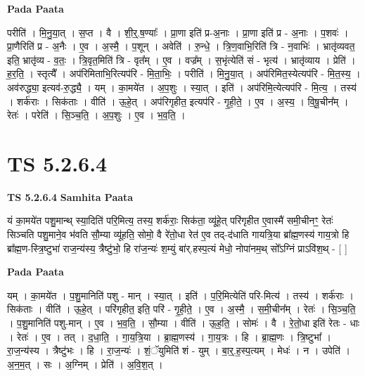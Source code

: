 \documentclass[17pt]{extarticle}
\begin{document}
\textbf{Pada Paata} \newline

परीति॑ । मि॒नु॒या॒त् । स॒प्त । वै । शी॒र्॒.ष॒ण्याः᳚ । प्रा॒णा इति॑ प्र-अ॒नाः । प्रा॒णा इति॑ प्र - अ॒नाः । प॒शवः॑ । प्रा॒णैरिति॑ प्र - अ॒नैः । ए॒व । अ॒स्मै॒ । प॒शून् । अवेति॑ । रु॒न्धे॒ । त्रि॒ण॒वाभि॒रिति॑ त्रि - न॒वाभिः॑ । भ्रातृ॑व्यवत॒ इति॒ भ्रातृ॑व्य - व॒तः॒ । त्रि॒वृत॒मिति॑ त्रि - वृत᳚म् । ए॒व । वज्र᳚म् । स॒भृंत्येति॑ सं - भृत्य॑ । भ्रातृ॑व्याय । प्रेति॑ । ह॒र॒ति॒ । स्तृत्यै᳚ । अप॑रिमिताभि॒रित्यप॑रि - मि॒ता॒भिः॒ । परीति॑ । मि॒नु॒या॒त् । अप॑रिमित॒स्येत्यप॑रि - मि॒त॒स्य॒ । अव॑रुद्ध्या॒ इत्यव॑-रु॒द्ध्यै॒ । यम् । का॒मये॑त । अ॒प॒शुः । स्या॒त् । इति॑ । अप॑रिमि॒त्येत्यप॑रि - मि॒त्य॒ । तस्य॑ । शर्क॑राः । सिक॑ताः । वीति॑ । ऊ॒हे॒त् । अप॑रिगृहीत॒ इत्यप॑रि - गृ॒ही॒ते॒ । ए॒व । अ॒स्य॒ । वि॒षू॒चीन᳚म् । रेतः॑ । परेति॑ । सि॒ञ्च॒ति॒ । अ॒प॒शुः । ए॒व । भ॒व॒ति॒ ।  \newline




\section*{ TS 5.2.6.4 }

\textbf{TS 5.2.6.4 } \newline
\textbf{Samhita Paata} \newline

यं का॒मये॑त पशु॒मान्थ् स्या॒दिति॑ परि॒मित्य॒ तस्य॒ शर्क॑राः॒ सिक॑ता॒ व्यू॑हे॒त् परि॑गृहीत ए॒वास्मै॑ समी॒चीनꣳ॒॒ रेतः॑ सिञ्चति पशु॒माने॒व भ॑वति सौ॒म्या व्यू॑हति॒ सोमो॒ वै रे॑तो॒धा रेत॑ ए॒व तद्-द॑धाति गायत्रि॒या ब्रा᳚ह्म॒णस्य॑ गाय॒त्रो हि ब्रा᳚ह्म॒ण-स्त्रि॒ष्टुभा॑ राज॒न्य॑स्य॒ त्रैष्टु॑भो॒ हि रा॑ज॒न्यः॑ श॒म्युं बा॑र्.हस्प॒त्यं मेधो॒ नोपा॑नम॒थ् सो᳚ऽग्निं प्राऽवि॑श॒थ् - [  ] \newline

\textbf{Pada Paata} \newline

यम् । का॒मये॑त । प॒शु॒मानिति॑ पशु - मान् । स्या॒त् । इति॑ । प॒रि॒मित्येति॑ परि-मित्य॑ । तस्य॑ । शर्क॑राः । सिक॑ताः । वीति॑ । ऊ॒हे॒त् । परि॑गृहीत॒ इति॒ परि॑ - गृ॒ही॒ते॒ । ए॒व । अ॒स्मै॒ । स॒मी॒चीन᳚म् । रेतः॑ । सि॒ञ्च॒ति॒ । प॒शु॒मानिति॑ पशु-मान् । ए॒व । भ॒व॒ति॒ । सौ॒म्या । वीति॑ । ऊ॒ह॒ति॒ । सोमः॑ । वै । रे॒तो॒धा इति॑ रेतः - धाः । रेतः॑ । ए॒व । तत् । द॒धा॒ति॒ । गा॒य॒त्रि॒या । ब्रा॒ह्म॒णस्य॑ । गा॒य॒त्रः । हि । ब्रा॒ह्म॒णः । त्रि॒ष्टुभा᳚ । रा॒ज॒न्य॑स्य । त्रैष्टु॑भः । हि । रा॒ज॒न्यः॑ । शं॒ॅयुमिति॑ शं - युम् । बा॒र्॒.ह॒स्प॒त्यम् । मेधः॑ । न । उपेति॑ । अ॒न॒म॒त् । सः । अ॒ग्निम् । प्रेति॑ । अ॒वि॒श॒त् ।  \newline
\end{document}
